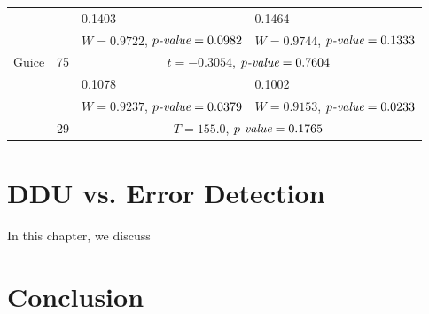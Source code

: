 \documentclass[twoside,a4paper,11pt]{memoir}
\begin{document}
\begin{table}[]
\begin{adjustbox}{center}
\begin{tabular}{llll}
 &  & 0.1403 & 0.1464 \\
 &  & $W = 0.9722$, $p\emph{-value} = 0.0982$ & $W = 0.9744$, $p\emph{-value} = 0.1333$ \\
\multirow{-3}{*}{Guice} & \multirow{-3}{*}{75} & \multicolumn{2}{c}{$t = -0.3054$, $p\emph{-value} = 0.7604$} \\
\rowcolor{Gray}
\cellcolor{Gray} & \cellcolor{Gray} & 0.1078 & 0.1002 \\
\rowcolor{Gray}
\cellcolor{Gray} & \cellcolor{Gray} & $W = 0.9237$, $p\emph{-value} = 0.0379$ & $W = 0.9153$, $p\emph{-value} = 0.0233$ \\
\rowcolor{Gray}
\multirow{-3}{*}{\cellcolor{Gray}Jsoup} & \multirow{-3}{*}{\cellcolor{Gray}29} & \multicolumn{2}{c}{\cellcolor{Gray}$T = 155.0$, $p\emph{-value} = 0.1765$}\\
\bottomrule
\end{tabular}
\end{adjustbox}
\end{table}

\chapter{DDU vs. Error Detection}
\label{ch:rq2}
In this chapter, we discuss

\chapter{Conclusion}
\label{ch:conclusion}




\end{document}
